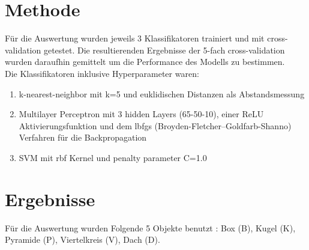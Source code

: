\documentclass[]{report}
\begin{document}
\section*{Methode}
Für die Auswertung wurden jeweils 3 Klassifikatoren trainiert und mit cross-validation getestet. Die resultierenden Ergebnisse der 5-fach cross-validation wurden daraufhin gemittelt um die Performance des Modells zu bestimmen.\\
Die Klassifikatoren inklusive Hyperparameter waren:
\begin{enumerate}
\item k-nearest-neighbor mit k=5 und euklidischen Distanzen als Abstandsmessung
\item Multilayer Perceptron mit 3 hidden Layers (65-50-10), einer ReLU Aktivierungsfunktion und dem lbfgs (Broyden-Fletcher–Goldfarb-Shanno) Verfahren für die Backpropagation
\item SVM mit rbf Kernel und penalty parameter C=1.0
\end{enumerate}  

\section*{Ergebnisse}
Für die Auswertung wurden Folgende 5 Objekte benutzt : Box (B), Kugel (K), Pyramide (P), Viertelkreis (V),  Dach (D).\\
\end{document}
